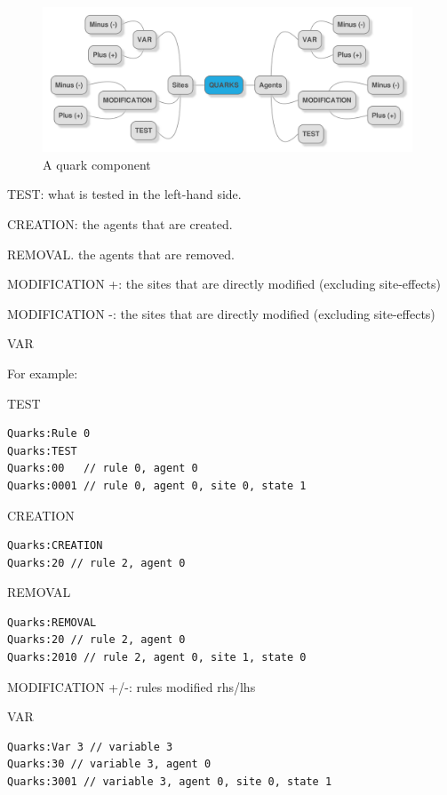 \documentclass{article}
\begin{document}
\begin{figure}[ht!]
\centering
\includegraphics[width=110mm]{quarks.png}
\caption{A quark component \label{quark}}
\end{figure}

\begin{e}
\item TEST: what is tested in the left-hand side.
\item CREATION: the agents that are created.
\item REMOVAL. the agents that are removed.
\item MODIFICATION +: the sites that are directly modified (excluding
  site-effects)
\item MODIFICATION -: the sites that are directly modified (excluding
  site-effects)
\item VAR
\end{e}

For example:
\begin{i}

\item TEST
\begin{verbatim}
Quarks:Rule 0
Quarks:TEST
Quarks:00   // rule 0, agent 0
Quarks:0001 // rule 0, agent 0, site 0, state 1
\end{verbatim}

\item CREATION
\begin{verbatim}
Quarks:CREATION
Quarks:20 // rule 2, agent 0
\end{verbatim}

\item REMOVAL
\begin{verbatim}
Quarks:REMOVAL
Quarks:20 // rule 2, agent 0
Quarks:2010 // rule 2, agent 0, site 1, state 0
\end{verbatim}

\item MODIFICATION +/-: rules modified rhs/lhs

\item VAR
\begin{verbatim}
Quarks:Var 3 // variable 3
Quarks:30 // variable 3, agent 0
Quarks:3001 // variable 3, agent 0, site 0, state 1
\end{verbatim}

\end{i}
\end{document}

